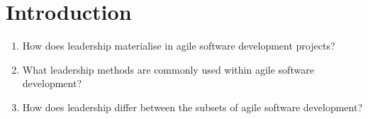\iffalse  \fi
\chapter{Introduction}



\begin{enumerate}[label=\textbf{RQ\arabic*}]
\label{section:rqs}
	\item How does leadership materialise in agile software development projects?
	\item What leadership methods are commonly used within agile software development?
	\item How does leadership differ between the subsets of agile software development?\\
\end{enumerate}




